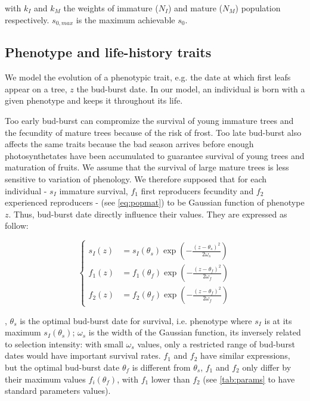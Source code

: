 with $k_{I}$ and $k_{M}$ the weights of immature ($N_{I}$) and mature ($N_{M}$) population respectively. $s_{0, max}$ is the maximum achievable $s_{0}$.

\subsection*{Phenotype and life-history traits}

We model the evolution of a phenotypic trait, e.g. the date at which first leafs appear on a tree, $z$ the bud-burst date. In our model, an individual is born with a given phenotype and keeps it throughout its life.

Too early bud-burst can compromize the survival of young immature trees and the fecundity of mature trees because of the risk of frost. Too late bud-burst also affects the same traits because the bad season arrives before enough photosynthetates have been accumulated to guarantee survival of young trees and maturation of fruits. We assume that the survival of large mature trees is less sensitive to variation of phenology. We therefore supposed that for each individual - $s_{I}$ immature survival, $f_1$ first reproducers fecundity and $f_2$ experienced reproducers - (see \autoref{eq:popmat}) to be Gaussian function of phenotype $z$. Thus, bud-burst date directly influence their values. They are expressed as follow:

\begin{equation}
	\label{eq:indlht}
	\left\{
	\begin{aligned}
	s_{I}(z) &= s_{I}(\theta_{s})	\exp\left(-\frac{(z - \theta_{s})^2}{2\omega_{s}}\right) \\
	f_1(z) &= f_1(\theta_{f})	\exp\left(-\frac{(z - \theta_{f})^2}{2\omega_{f}}\right) \\
	f_2(z) &= f_2(\theta_{f})	\exp\left(-\frac{(z - \theta_{f})^2}{2\omega_{f}}\right)
	\end{aligned}
	\right.
\end{equation}


, $\theta_s$ is the optimal bud-burst date for survival, i.e. phenotype where $s_I$ is at its maximum $s_I(\theta_s)$; $\omega_s$ is the width of the Gaussian function, its inversely related to selection intensity: with small $\omega_s$ values, only a restricted range of bud-burst dates would have important survival rates. $f_1$ and $f_2$ have similar expressions, but the optimal bud-burst date $\theta_f$ is different from $\theta_s$, $f_1$ and $f_2$ only differ by their maximum values $f_i(\theta_f)$, with $f_1$ lower than $f_2$ (see \autoref{tab:params} to have standard parameters values).

